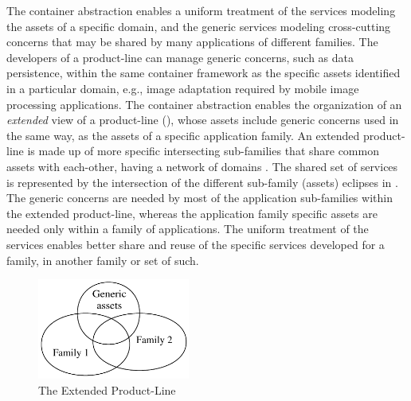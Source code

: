 The container abstraction enables a uniform treatment of the services modeling the assets of a specific domain, and the generic services modeling cross-cutting concerns  that may be shared by many applications of different families. The developers of a product-line can manage generic concerns, such as data persistence, within the same container framework as the specific assets identified in a particular domain, e.g., image adaptation required by mobile image processing applications. The container abstraction enables the organization of an \textit{extended} view of a product-line (), whose assets include generic concerns used in the same way, as the assets of a specific application family. An extended product-line is made up of more specific intersecting sub-families that share common assets with each-other, having a network of domains \cite{generative.00}. The shared set of services is represented by the intersection of the different sub-family (assets) eclipses in . The generic concerns are needed by most of the application sub-families within the extended product-line, whereas the application family specific assets are needed only within a family of applications. The uniform treatment of the services enables better share and reuse of the specific services developed for a family, in another family or set of such.

\begin{figure}[ht]
	\begin{center}
		\includegraphics[width=5cm,height=!]{ch02/extended-pl}
	\end{center}
	\caption{The Extended Product-Line}
	\label{c2fig:extended-pl}
\end{figure}


